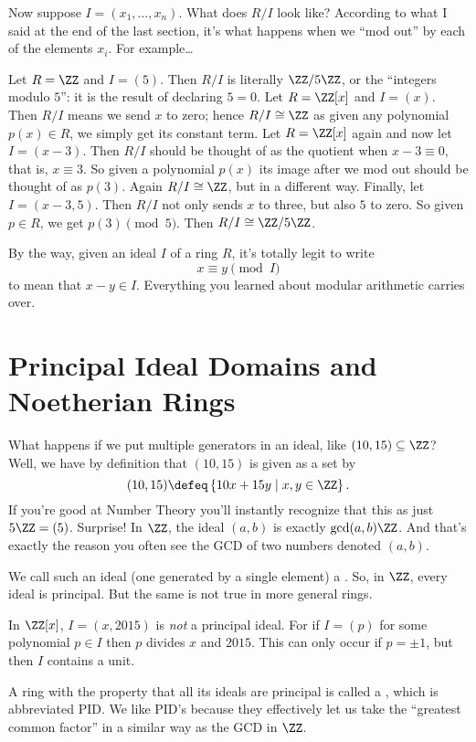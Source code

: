 Now suppose $I = (x_1, \dots, x_n)$.
What does $R/I$ look like?
According to what I said at the end of the last section,
it's what happens when we ``mod out'' by each of the elements $x_i$.
For example\dots
\begin{example}
	\listhack
	\begin{enumerate}[(a)]
		\ii Let $R = \ZZ$ and $I = (5)$. Then $R/I$ is literally
		$\ZZ/5\ZZ$, or the ``integers modulo $5$'':
		it is the result of declaring $5 = 0$.
		\ii Let $R = \ZZ[x]$ and $I = (x)$.
		Then $R/I$ means we send $x$ to zero; hence $R/I \cong \ZZ$
		as given any polynomial $p(x) \in R$,
		we simply get its constant term.
		\ii Let $R = \ZZ[x]$ again and now let $I = (x-3)$.
		Then $R/I$ should be thought of as the quotient when $x-3 \equiv 0$,
		that is, $x \equiv 3$.
		So given a polynomial $p(x)$ its image after
		we mod out should be thought of as $p(3)$.
		Again $R/I \cong \ZZ$, but in a different way.
		\ii Finally, let $I = (x-3,5)$.
		Then $R/I$ not only sends $x$ to three, but also $5$ to zero.
		So given $p \in R$, we get $p(3) \pmod 5$.
		Then $R/I \cong \ZZ/5\ZZ$.
	\end{enumerate}
\end{example}
By the way, given an ideal $I$ of a ring $R$, it's totally legit to write
\[ x \equiv y \pmod I \]
to mean that $x-y \in I$.
Everything you learned about modular arithmetic carries over.

\section{Principal Ideal Domains and Noetherian Rings}

What happens if we put multiple generators in an ideal, like $(10,15) \subseteq \ZZ$?
Well, we have by definition that $(10,15)$ is given as a set by
\[ 
	(10,15) \defeq \left\{ 10x + 15y \mid x,y \in \ZZ \right\}.
\]
If you're good at Number Theory you'll instantly recognize that this as just $5\ZZ = (5)$.
Surprise! In $\ZZ$, the ideal $(a,b)$ is exactly $\gcd(a,b) \ZZ$.
And that's exactly the reason you often see the GCD of two numbers denoted $(a,b)$.

We call such an ideal (one generated by a single element) a .
So, in $\ZZ$, every ideal is principal.
But the same is not true in more general rings.
\begin{example}
	In $\ZZ[x]$, $I = (x,2015)$ is \emph{not} a principal ideal.
	For if $I = (p)$ for some polynomial $p \in I$
	then $p$ divides $x$ and $2015$.
	This can only occur if $p = \pm 1$,
	but then $I$ contains a unit.
\end{example}
A ring with the property that all its ideals are principal is called a ,
which is abbreviated PID.
We like PID's because they effectively let us take the ``greatest common factor''
in a similar way as the GCD in $\ZZ$.

